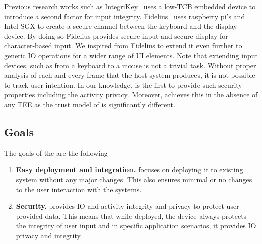  Previous research works such as IntegriKey~\cite{IntegriKey} uses a low-TCB embedded device to introduce a second factor for input integrity. Fidelius~\cite{Fidelius} uses raspberry pi's and Intel SGX to create a secure channel between the keyboard and the display device. By doing so Fidelius provides secure input and secure display for character-based input. We inspired from Fidelius to extend it even further to generic IO operations for a wider range of UI elements. Note that extending input devices, such as from a keyboard to a mouse is not a trivial task. Without proper analysis of each and every frame that the host system produces, it is not possible to track user intention. In our knowledge, \name is the first to provide such security properties including the activity privacy. Moreover, \name achieves this in the absence of any TEE as the trust model of \name is significantly different. 


\subsection{Goals}

The goals of the \name are the following

\begin{enumerate}
  \item \textbf{Easy deployment and integration.} \name focuses on deploying it to existing system without any major changes. This also ensures minimal or no changes to the user interaction with the systems.
  \item \textbf{Security.} \name provides IO and activity integrity and privacy to protect user provided data. This means that while deployed, the device always protects the integrity of user input and in specific application scenarios, it provides IO privacy and integrity.
\end{enumerate}



